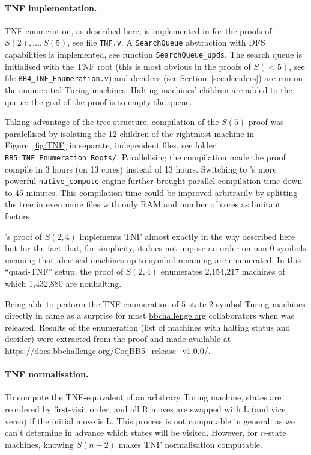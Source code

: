 \paragraph{\CoqBB TNF implementation.} TNF enumeration, as described here, is implemented in \CoqBB for the proofs of $S(2),\dots,S(5)$, see file \texttt{TNF.v}. A \texttt{SearchQueue} abstraction with DFS capabilities is implemented, see function \texttt{SearchQueue\_upds}. The search queue is initialised with the TNF root (this is most obvious in the proofs of $S(<5)$, \eg see file \texttt{BB4\_TNF\_Enumeration.v}) and deciders (see Section~\ref{sec:deciders}) are run on the enumerated Turing machines. Halting machines' children are added to the queue: the goal of the proof is to empty the queue.

Taking advantage of the tree structure, compilation of the $S(5)$ proof was paralellised by isolating the 12 children of the rightmost machine in Figure~\ref{fig:TNF} in separate, independent files, see folder \texttt{BB5\_TNF\_Enumeration\_Roots/}. Parallelising the compilation made the proof compile in 3 hours (on 13 cores) instead of 13 hours. Switching to \Coq's more powerful \texttt{native\_compute} engine \cite{nativecompute} further brought parallel compilation time down to 45 minutes. This compilation time could be improved arbitrarily by splitting the tree in even more files with only RAM and number of cores as limitant factors.

\CoqBB's proof of $S(2,4)$ implements TNF almost exactly in the way described here but for the fact that, for simplicity, it does not impose an order on non-0 symbols meaning that identical machines up to symbol renaming are enumerated. In this ``quasi-TNF'' setup, the proof of $S(2,4)$ enumerates 2,154,217 machines of which 1,432,880 are nonhalting.

Being able to perform the TNF enumeration of 5-state 2-symbol Turing machines directly in \Coq came as a surprise for most \url{bbchallenge.org} collaborators when \CoqBB was released. Results of the enumeration (\ie list of machines with halting status and decider) were extracted from the proof and made available at \url{https://docs.bbchallenge.org/CoqBB5_release_v1.0.0/}.




\paragraph{TNF normalisation.} To compute the TNF-equivalent of an arbitrary Turing machine, states are reordered by first-visit order, and all R moves are swapped with L (and vice versa) if the initial move is L. This process is not computable in general, as we can't determine in advance which states will be visited. However, for $n$-state machines, knowing $S(n-2)$ makes TNF normalisation computable. %